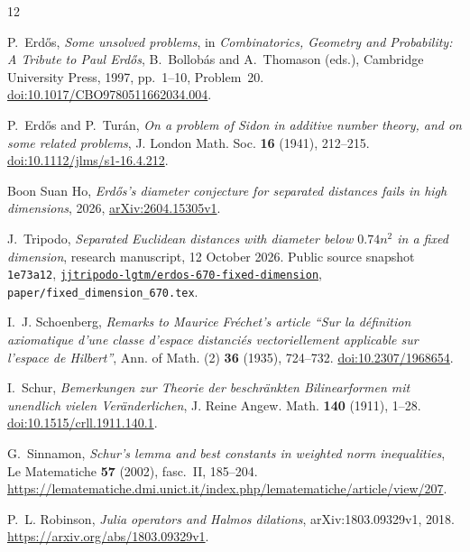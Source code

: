 \documentclass[11pt]{article}
\numberwithin{equation}{section}
\theoremstyle{definition}\newtheorem{definition}[theorem]{Definition}
\theoremstyle{remark}\newtheorem{remark}[theorem]{Remark}
\newcommand{\TripodoCommit}{\texttt{1e73a12}}
\begin{document}
\clearpage
\begin{thebibliography}{12}
\raggedright


P.~Erd\H{o}s,
\emph{Some unsolved problems},
in \emph{Combinatorics, Geometry and Probability: A Tribute to Paul Erd\H{o}s},
B.~Bollob\'as and A.~Thomason (eds.),
Cambridge University Press, 1997, pp.~1--10, Problem~20.
\href{https://doi.org/10.1017/CBO9780511662034.004}{doi:10.1017/CBO9780511662034.004}.

P.~Erd\H{o}s and P.~Tur\'an,
\emph{On a problem of Sidon in additive number theory, and on some related problems},
J. London Math. Soc. \textbf{16} (1941), 212--215.
\href{https://doi.org/10.1112/jlms/s1-16.4.212}{doi:10.1112/jlms/s1-16.4.212}.

Boon Suan Ho,
\emph{Erd\H{o}s's diameter conjecture for separated distances fails in high dimensions},
2026, \href{https://arxiv.org/abs/2604.15305v1}{arXiv:2604.15305v1}.

J.~Tripodo,
\emph{Separated Euclidean distances with diameter below $0.74n^2$ in a fixed dimension},
research manuscript, 12 October 2026.
Public source snapshot \TripodoCommit,
\href{https://github.com/jjtripodo-lgtm/erdos-670-fixed-dimension/tree/1e73a12ff1076dd11affadbf619ddbbef587133e}{\texttt{jjtripodo-lgtm/erdos-670-fixed-dimension}},
\texttt{paper/fixed\_dimension\_670.tex}.

I.~J. Schoenberg,
\emph{Remarks to Maurice Fr\'echet's article ``Sur la d\'efinition axiomatique d'une classe d'espace distanci\'es vectoriellement applicable sur l'espace de Hilbert''},
Ann. of Math. (2) \textbf{36} (1935), 724--732.
\href{https://doi.org/10.2307/1968654}{doi:10.2307/1968654}.

I.~Schur,
\emph{Bemerkungen zur Theorie der beschr\"ankten Bilinearformen mit unendlich vielen Ver\"anderlichen},
J. Reine Angew. Math. \textbf{140} (1911), 1--28.
\href{https://doi.org/10.1515/crll.1911.140.1}{doi:10.1515/crll.1911.140.1}.

G.~Sinnamon,
\emph{Schur's lemma and best constants in weighted norm inequalities},
Le Matematiche \textbf{57} (2002), fasc.~II, 185--204.
\url{https://lematematiche.dmi.unict.it/index.php/lematematiche/article/view/207}.

P.~L. Robinson,
\emph{Julia operators and Halmos dilations}, arXiv:1803.09329v1, 2018.
\url{https://arxiv.org/abs/1803.09329v1}.


\end{thebibliography}
\end{document}

